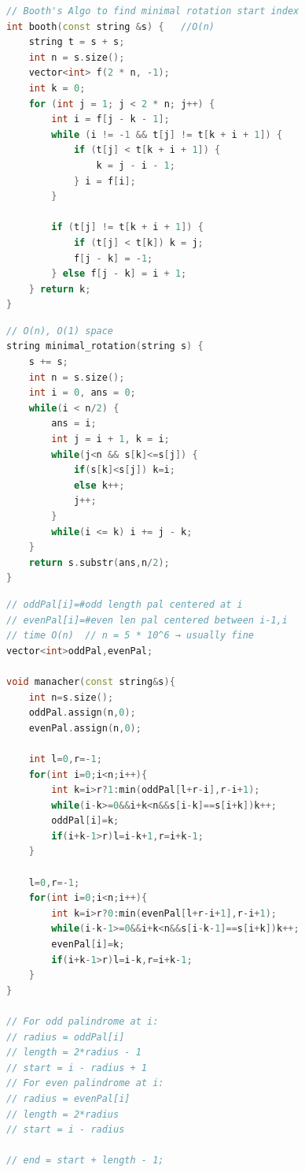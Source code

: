 
\begin{lstlisting}[language=C++]
// Booth's Algo to find minimal rotation start index
int booth(const string &s) {   //O(n)
    string t = s + s;
    int n = s.size();
    vector<int> f(2 * n, -1);
    int k = 0;
    for (int j = 1; j < 2 * n; j++) {
        int i = f[j - k - 1];
        while (i != -1 && t[j] != t[k + i + 1]) {
            if (t[j] < t[k + i + 1]) {
                k = j - i - 1;
            } i = f[i];
        }

        if (t[j] != t[k + i + 1]) {
            if (t[j] < t[k]) k = j;
            f[j - k] = -1;
        } else f[j - k] = i + 1;
    } return k;
}
\end{lstlisting}


\begin{lstlisting}[language=C++]
// O(n), O(1) space
string minimal_rotation(string s) {
    s += s;
    int n = s.size();
    int i = 0, ans = 0;
    while(i < n/2) {
        ans = i;
        int j = i + 1, k = i;
        while(j<n && s[k]<=s[j]) {
            if(s[k]<s[j]) k=i;
            else k++;
            j++;
        }
        while(i <= k) i += j - k;
    }
    return s.substr(ans,n/2);
}
\end{lstlisting}


\begin{lstlisting}[language=C++]
// oddPal[i]=#odd length pal centered at i
// evenPal[i]=#even len pal centered between i-1,i
// time O(n)  // n = 5 * 10^6 → usually fine
vector<int>oddPal,evenPal;

void manacher(const string&s){
    int n=s.size();
    oddPal.assign(n,0);
    evenPal.assign(n,0);

    int l=0,r=-1;
    for(int i=0;i<n;i++){
        int k=i>r?1:min(oddPal[l+r-i],r-i+1);
        while(i-k>=0&&i+k<n&&s[i-k]==s[i+k])k++;
        oddPal[i]=k;
        if(i+k-1>r)l=i-k+1,r=i+k-1;
    }

    l=0,r=-1;
    for(int i=0;i<n;i++){
        int k=i>r?0:min(evenPal[l+r-i+1],r-i+1);
        while(i-k-1>=0&&i+k<n&&s[i-k-1]==s[i+k])k++;
        evenPal[i]=k;
        if(i+k-1>r)l=i-k,r=i+k-1;
    }
}

// For odd palindrome at i:
// radius = oddPal[i]
// length = 2*radius - 1
// start = i - radius + 1
// For even palindrome at i:
// radius = evenPal[i]
// length = 2*radius
// start = i - radius

// end = start + length - 1;
\end{lstlisting}


